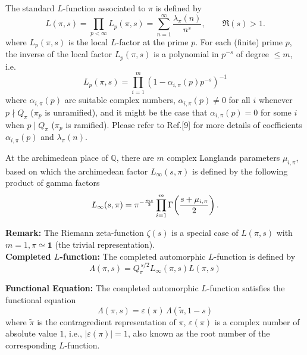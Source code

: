 \documentclass[12pt]{article}
\begin{document}
The standard $L$-function associated to $\pi$ is defined by
\begin{equation}
L(\pi, s)=\prod_{p<\infty} L_p(\pi, s)=\sum_{n=1}^{\infty} \frac{\lambda_{\pi}(n)}{n^s}, \quad\quad\Re(s)>1.
\end{equation}
where $L_p(\pi, s)$ is the local $L$-factor at the prime $p$. For each (finite) prime $p$, the
inverse of the local factor $L_p(\pi, s)$ is a polynomial in $p^{-s}$ of degree
$\leq m$, i.e.
\begin{equation}
L_p(\pi, s)=\prod_{i=1}^m \left(1-\alpha_{i,\pi}(p)p^{-s}\right)^{-1}
\end{equation}
where $\alpha_{i, \pi}(p)$ are suitable complex numbers,
$\alpha_{i, \pi}(p) \neq 0$ for all $i$ whenever $p \nmid Q_{\pi}$ ($\pi_p$ is unramified), and it might
be the case that $\alpha_{i, \pi}(p) = 0$ for some $i$ when $p\mid Q_{\pi}$ ($\pi_p$ is ramified). Please refer to Ref.[9] for more details of coefficients $\alpha_{i, \pi}(p)$ and $\lambda_{\pi}(n)$.

At the archimedean place of $\mathbb{Q}$, there are $m$ complex Langlands
parameters $\mu_{i, \pi}$, based on which the archimedean
factor $L_{\infty}(s, \pi)$ is defined by the following product of gamma factors
\begin{equation}
L_{\infty}(s, \pi) = \pi^{-\frac{ms}{2}} \prod_{i = 1}^{m}
\Gamma\!\left( \frac{s + \mu_{i, \pi}}{2} \right). \notag
\end{equation}

\textbf{Remark:} The Riemann zeta-function $\zeta(s)$ is a special case of $L(\pi, s)$ with $m=1, \pi \simeq \mathbf{1}$ (the trivial representation). \\

\textbf{Completed $L$-function:}
The completed automorphic $L$-function is defined by
\begin{equation}
\Lambda(\pi, s)=Q_\pi^{\,s/2}L_\infty(\pi, s)L(\pi, s)
\end{equation}

\textbf{Functional Equation:}
The completed automorphic $L$-function satisfies the functional equation
\begin{equation}
\Lambda(\pi, s)=\varepsilon(\pi)\,\Lambda(\tilde{\pi}, 1-s)
\end{equation}
where $\tilde{\pi}$ is the contragredient representation of $\pi$, $\varepsilon(\pi)$ is a complex number of absolute value $1$, i.e., $|\varepsilon(\pi)|=1$,  also known as the root number of the corresponding $L$-function.
\end{document}
